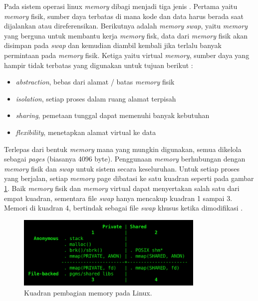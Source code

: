 Pada sistem operasi linux \textit{memory} dibagi menjadi tiga jenis \cite{manual:linux}. Pertama yaitu \textit{memory} fisik, sumber daya terbatas di mana kode dan data harus berada saat dijalankan atau direferensikan. Berikutnya adalah \textit{memory} \textit{swap}, yaitu  \textit{memory} yang berguna untuk membantu kerja \textit{memory} fisk, data dari \textit{memory} fisik akan disimpan pada \textit{swap} dan kemudian diambil kembali jika terlalu banyak permintaan pada \textit{memory} fisik. Ketiga yaitu virtual \textit{memory}, sumber daya yang hampir tidak terbatas yang digunakan untuk tujuan berikut \cite{book:os}:

\begin{itemize} [noitemsep, topsep=0pt]
    \item \textit{abstraction}, bebas dari alamat / batas \textit{memory} fisik 
    \item \textit{isolation}, setiap proses dalam ruang alamat terpisah 
    \item \textit{sharing}, pemetaan tunggal dapat memenuhi banyak kebutuhan 
    \item \textit{flexibility}, menetapkan alamat virtual ke data 
\end{itemize}

Terlepas dari bentuk \textit{memory} mana yang mungkin digunakan, semua dikelola sebagai \textit{pages} (biasanya 4096
byte). Penggunaan \textit{memory} berhubungan dengan \textit{memory} fisik dan \textit{swap} untuk sistem secara keseluruhan. 
Untuk setiap proses yang berjalan, setiap \textit{memory} page dibatasi ke satu kuadran seperti pada gambar \ref{fig:mem-quad}. Baik \textit{memory} fisik dan \textit{memory} virtual dapat menyertakan salah satu dari empat kuadran, sementara file \textit{swap} hanya mencakup kuadran 1 sampai 3. Memori di kuadran 4, bertindak sebagai file \textit{swap} khusus ketika dimodifikasi \cite{manual:linux}. 

\begin{figure}[H]
    \includegraphics[width=0.8\textwidth, center]{images/programs/memory-quadrant.png}
    \caption{Kuadran pembagian memory pada Linux.}
    \label{fig:mem-quad}
\end{figure}

